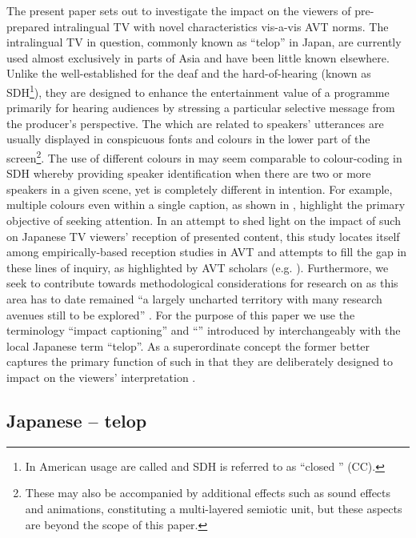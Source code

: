 \documentclass[output=paper]{langsci/langscibook}
\begin{document}
The present paper sets out to investigate the impact on the viewers of pre-prepared intralingual TV  with novel characteristics vis-a-vis AVT norms. The intralingual TV  in question, commonly known as ``telop'' in Japan, are currently used almost exclusively in parts of Asia and have been little known elsewhere.  Unlike the well-established  for the deaf and the hard-of-hearing (known as SDH\footnote{In American usage  are called  and SDH is referred to as ``closed '' (CC).}), they are designed to enhance the entertainment value of a programme primarily for hearing audiences by stressing a particular selective message from the producer's perspective. The  which are related to speakers' utterances are usually displayed in conspicuous fonts and colours in the lower part of the screen\footnote{ These  may also be accompanied by additional effects such as sound effects and animations, constituting a multi-layered semiotic unit, but these aspects are beyond the scope of this paper.}. The use of different colours in  may seem comparable to colour-coding in SDH whereby providing speaker identification when there are two or more speakers in a given scene, yet is completely different in intention. For example, multiple colours even within a single caption, as shown in , highlight the primary objective of seeking attention. In an attempt to shed light on the impact of such  on Japanese TV viewers' reception of presented content, this study locates itself among empirically-based reception studies in AVT and attempts to fill the gap in these lines of inquiry, as highlighted by AVT scholars (e.g. \citealt{gambier2013}). Furthermore, we seek to contribute towards methodological considerations for  research on  as this area has to date remained ``a largely uncharted territory with many research avenues still to be explored'' \citep[n.p.]{Kruger2015}.  For the purpose of this paper we use the terminology ``impact captioning'' and ``'' introduced by \citet{Park2009} interchangeably with the local Japanese term ``telop''. As a superordinate concept the former better captures the primary function of such  in that they are deliberately designed to impact on the viewers' interpretation \citep{Shiota2003}.

\subsection{Japanese  -- telop}
\end{document}
